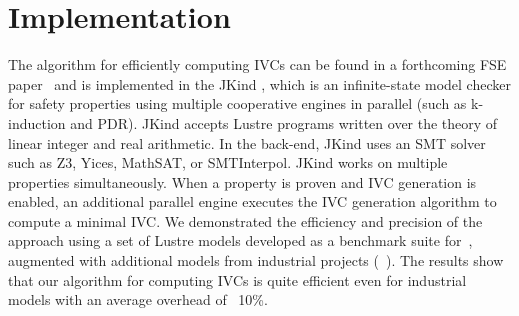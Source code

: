 \section{Implementation}
\label{sec:impl}

The algorithm for efficiently computing IVCs can be found in a forthcoming FSE paper~\cite{Ghass16} and is implemented in the JKind \cite{jkind}, which is an infinite-state model checker for safety properties using multiple cooperative engines in parallel (such as k-induction and PDR). JKind accepts
Lustre programs written over the theory of linear integer and real
arithmetic. In the back-end, JKind uses an SMT solver such as
Z3, Yices, MathSAT, or SMTInterpol.
JKind works on multiple properties simultaneously. When a
property is proven and IVC generation is enabled, an additional
parallel engine executes the IVC generation algorithm to compute a minimal
IVC. We demonstrated the efficiency and precision of the approach using a set of Lustre models developed
as a benchmark suite for~\cite{Hagen08:FMCAD}, augmented with additional models from industrial projects (~\cite{QFCS15:backes,hilt2013}). The results show that our algorithm for computing IVCs is quite efficient even for industrial models with an average overhead of ~10\%. 